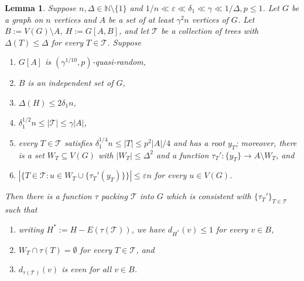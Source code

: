 \documentclass[a4paper, 11pt, reqno]{amsart}
\newtheorem{lemma}[definition]{Lemma}
\numberwithin{equation}{section}
\newcommand{\1}{{\rm 1\hspace*{-0.4ex}%
\rule{0.1ex}{1.52ex}\hspace*{0.2ex}}}
\newcommand{\N}{\mathbb N}
\newcommand{\es}{\emptyset}
\newcommand{\cT}{\mathcal{T}}
\renewcommand{\epsilon}{\varepsilon}
\newcommand{\sm}{\setminus}
\newcommand{\sub}{\subseteq}
\begin{document}
\begin{lemma}\label{lem: clear delta_1}
Suppose $n,\Delta \in \N\sm\{1\}$ and $1/n\ll \epsilon\ll \delta_1 \ll \gamma \ll 1/\Delta, p\leq 1$.
Let $G$ be a graph on $n$ vertices and $A$ be a set of at least $\gamma^2 n$ vertices of $G$.
Let $B:=V(G)\sm A$, $H:=G[A,B]$, and 
let $\cT$ be a collection of trees with $\Delta(T)\leq \Delta$ for every $T\in \cT$. 
Suppose 
\begin{enumerate}[label=(c4.\arabic*)]
	\item\label{item:L41} $G[A]$ is $(\gamma^{1/10},p)$-quasi-random, 
	\item\label{item:L42} $B$ is an independent set of $G$,
	\item\label{item:L43} $\Delta(H)\leq 2\delta_1 n$,
	\item\label{item:L44} $\delta_1^{1/2} n \leq |\cT| \leq \gamma |A|$, 
	\item\label{item:L45}	every $T\in \cT$ satisfies $\delta_1^{1/4} n\leq |T|\leq p^2|A|/4$ and has a root $y_T$;
	moreover, there is a set $W_T\sub V(G)$ with $|W_T|\leq \Delta^2$ and
	a function $\tau_T':\{y_T\}\to A \sm W_{T}$, and 
	\item\label{item:L46} $|\{T\in \cT: u\in W_{T}\cup \{\tau_T'(y_T)\}\}|\leq \epsilon n$ for every $u\in V(G)$.
\end{enumerate}
Then there is a function $\tau$ packing $\cT$ into $G$ which is consistent with $\{\tau_T'\}_{T\in \cT}$ such that 
\begin{enumerate}[label=(C4.\arabic*)]
	\item\label{item:Q41} writing $H^* := H -  E(\tau(\cT))$, we have $d_{H^*}(v)\leq 1$ for every $v \in B$,
	\item\label{item:Q42} $W_{T}\cap  \tau(T)=\es$ for every $T\in \cT$, and
	\item\label{item:Q43} $d_{\tau(\cT)}(v)$ is even for all $v\in B$.
	\end{enumerate}
\end{lemma}
\end{document}
